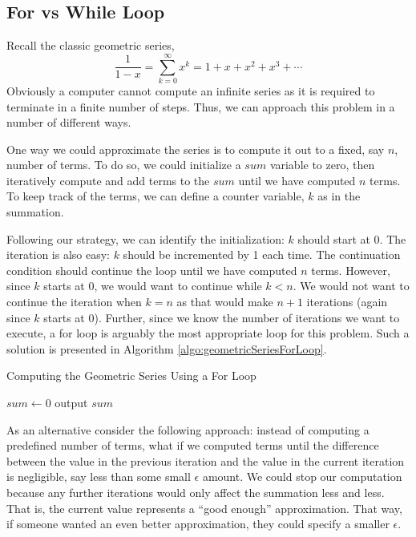 \subsection{For vs While Loop}

Recall the classic geometric series, 
  $$\frac{1}{1-x} = \sum_{k=0}^\infty x^k = 1 + x + x^2 + x^3 + \cdots$$
Obviously a computer cannot compute an infinite series as it is required to 
terminate in a finite number of steps.  Thus, we can approach this problem in
a number of different ways.  

One way we could approximate the series is to compute it out to a fixed, say $n$, 
number of terms.  To do so, we could initialize a $sum$ variable to zero, then 
iteratively compute and add terms to the $sum$ until we have computed $n$ 
terms.  To keep track of the terms, we can define a counter variable, $k$ as in 
the summation.  

Following our strategy, we can identify the initialization: $k$ should start at $0$.
The iteration is also easy: $k$ should be incremented by 1 each time.  The 
continuation condition should continue the loop until we have computed $n$ terms.
However, since $k$ starts at 0, we would want to continue while $k < n$.  We
would not want to continue the iteration when $k = n$ as that would make $n + 1$
iterations (again since $k$ starts at 0).  Further, since we know the number of
iterations we want to execute, a for loop is arguably the most appropriate loop
for this problem.  Such a solution is presented in Algorithm \ref{algo:geometricSeriesForLoop}.

\begin{algorithm}[h]
\caption{Computing the Geometric Series Using a For Loop}
\label{algo:geometricSeriesForLoop}
$sum \leftarrow 0$ \;
output $sum$ \;
\end{algorithm}

As an alternative consider the following approach: instead of computing a 
predefined number of terms, what if we computed terms until the difference
between the value in the previous iteration and the value in the current 
iteration is negligible, say less than some small $\epsilon$ amount.  We could
stop our computation because any further iterations would only affect the 
summation less and less.  That is, the current value represents a ``good
enough'' approximation.  That way, if someone wanted an even better
approximation, they could specify a smaller $\epsilon$.

